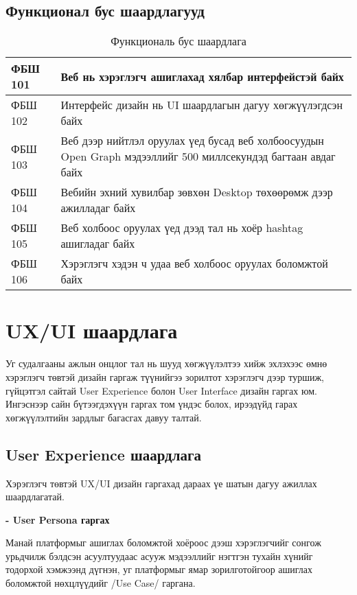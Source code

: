 \subsection{Функционал бус шаардлагууд}

	\begin{table}[h]
		\centering
		\caption{Функциональ бус шаардлага}
		\begin{tabular}{ |p{2cm}|p{13cm}| }
		\hline
		ФБШ 101 &  Веб нь хэрэглэгч ашиглахад хялбар интерфейстэй байх \\ \hline
		ФБШ 102 &  Интерфейс дизайн нь UI шаардлагын дагуу хөгжүүлэгдсэн байх \\ \hline
		ФБШ 103 &  Веб дээр нийтлэл оруулах үед бусад веб холбоосуудын Open Graph мэдээллийг 500 миллсекундэд багтаан авдаг байх \\ \hline
		ФБШ 104 &  Вебийн эхний хувилбар зөвхөн Desktop төхөөрөмж дээр ажилладаг байх \\ \hline
		ФБШ 105 &  Веб холбоос оруулах үед дээд тал нь хоёр hashtag ашигладаг байх \\ \hline
		ФБШ 106 &  Хэрэглэгч хэдэн ч удаа веб холбоос оруулах боломжтой байх \\  \hline
	\end{tabular}
	\end{table}

\section{UX/UI шаардлага}

Уг судалгааны ажлын онцлог тал нь шууд хөгжүүлэлтээ хийж эхлэхээс өмнө хэрэглэгч төвтэй дизайн гаргаж түүнийгээ зорилтот хэрэглэгч дээр туршиж, гүйцэтгэл сайтай User Experience болон User Interface дизайн гаргах юм. Ингэснээр сайн бүтээгдэхүүн гаргах том үндэс болох, ирээдүйд гарах хөгжүүлэлтийн зардлыг багасгах давуу талтай. 

\subsection{User Experience шаардлага}

Хэрэглэгч төвтэй UX/UI дизайн гаргахад дараах үе шатын дагуу ажиллах шаардлагатай.

\textbf{- User Persona гаргах} 

Манай платформыг ашиглах боломжтой хоёроос дээш хэрэглэгчийг сонгож урьдчилж бэлдсэн асуултуудаас асууж мэдээллийг нэгтгэн тухайн хүнийг тодорхой хэмжээнд дүгнэн, уг платформыг ямар зорилготойгоор ашиглах боломжтой нөхцлүүдийг /Use Case/ гаргана.

